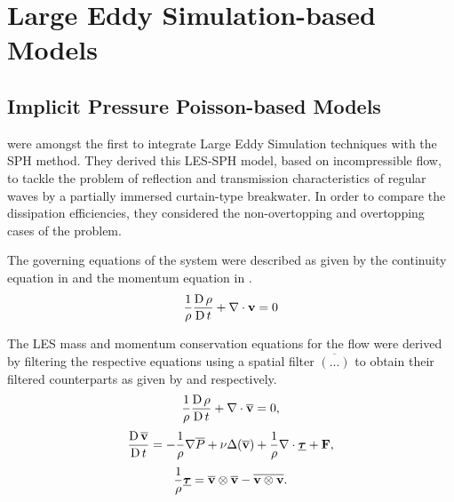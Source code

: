 \section{Large Eddy Simulation-based Models}
\label{sec:les-based-model}
\subsection{Implicit Pressure Poisson-based Models}
\label{sec:Implicit-Pressure-Poisson-based-Models}
\cite{Gotoh2004} were amongst the first to integrate Large Eddy Simulation techniques with the SPH method. They derived this LES-SPH model, based on incompressible flow, to tackle the problem of reflection and transmission characteristics of regular waves by a partially immersed curtain-type breakwater. In order to compare the dissipation efficiencies, they considered the non-overtopping and overtopping cases of the problem.

The governing equations of the system were described as given by the continuity equation in  and the momentum equation in .
\begin{equation}
    \frac{1}{\rho} \frac{\operatorname{D} \rho}{\operatorname{D} t} + \nabla \cdot \mathbf{v} = 0
    \label{eq:Gotoh2004-continuity-governing}
\end{equation}

The LES mass and momentum conservation equations for the flow were derived by filtering the respective equations using a spatial filter $\overline{(...)}$ to obtain their filtered counterparts as given by  and  respectively.
\begin{equation}
    \frac{1}{\rho} \frac{\operatorname{D} \rho}{\operatorname{D} t} + \nabla \cdot \mathbf{\overline{v}} = 0,
    \label{eq:Gotoh2004-continuity-filtered}
\end{equation}
\begin{equation}
    \frac{\operatorname{D} \mathbf{\overline{v}}}{\operatorname{D} t} = -\frac{1}{\rho}\nabla \overline{P} + \nu \Delta ( \mathbf{\overline{v}} ) + \frac{1}{\rho}\nabla\cdot\underline{\bm{\tau}} + \mathbf{F},
    \label{eq:Gotoh2004-mom-filtered}
\end{equation}
\begin{equation}
    \frac{1}{\rho} \underline{\bm{\tau}} = \mathbf{\overline{v}} \otimes \mathbf{\overline{v}} - \overline{\mathbf{v} \otimes \mathbf{v}}.
    \label{eq:Gotoh2004-stress-tensor}
\end{equation}

